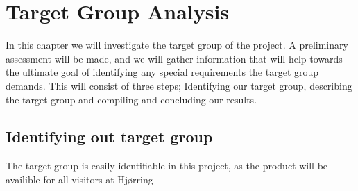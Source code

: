 \chapter{Target Group Analysis}

In this chapter we will investigate the target group of the project. A preliminary assessment will be made, and we will gather information that will help towards the ultimate goal of identifying any special requirements the target group demands. This will consist of three steps; Identifying our target group, describing the target group and compiling and concluding our results.

\section{Identifying out target group}
The target group is easily identifiable in this project, as the product will be availible for all visitors at Hj{\o}rring 